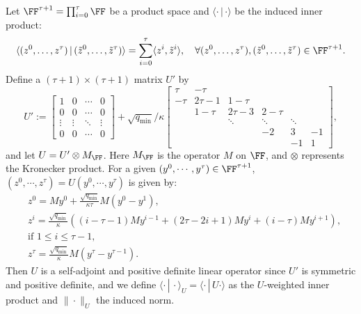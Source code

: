 {Let $\FF^{\tau+1}=\prod_{i=0}^{\tau}\FF$ be a product space and $\langle\cdot\, |\,\cdot \rangle$ be the induced  inner product:
$$\langle (z^0,\ldots,z^{\tau})\,|\,(\tilde{z}^0,\ldots,\tilde{z}^{\tau})\rangle=\sum_{i=0}^{\tau}\langle z^i,\tilde{z}^i\rangle,\quad\forall (z^0,\ldots,z^{\tau}), (\tilde{z}^0,\ldots,\tilde{z}^{\tau})\in\FF^{\tau+1}.$$ 
Define a $(\tau+1)\times(\tau+1)$ matrix $U'$ by 
\begin{equation*}%
U':=\begin{bmatrix}1 & 0 & \cdots &0\\
0 & 0 &\cdots & 0\\ \vdots &\vdots & \ddots & \vdots\\
0 & 0 &\cdots & 0 \end{bmatrix}
+\sqrt{q_{\min}}/\kappa\begin{bmatrix} \tau & -\tau &  & \\
-\tau & 2\tau-1 & 1-\tau & \\
 & 1-\tau & 2\tau-3 & 2-\tau  & \\
 & & \ddots & \ddots & \ddots &\\
 & & & -2 & 3  & -1 \\
 & & & &-1 & 1
\end{bmatrix},
\end{equation*}
and let $U=U'\otimes M_\FF$. Here $M_\FF$ is the operator $M$ on $\FF$, and
$\otimes$ represents the Kronecker product. For a given $(y^0,\cdots,y^\tau)\in\FF^{\tau+1}$, $(z^0,\cdots,z^\tau)=U(y^0,\cdots,y^\tau)$ is given by:
\begin{align*}
&z^0=\textstyle
My^0+\frac{\sqrt{q_{\min}}}{\kappa\tau} M(y^0-y^1),\\
&z^i =
\textstyle\frac{\sqrt{q_{\min}}}{\kappa}((i-\tau-1)My^{i-1}+(2\tau-2i+1)My^i+(i-\tau)My^{i+1}),\\
&\text{
if } 1\le i\le \tau-1,\\
&z^{\tau}=\textstyle\frac{\sqrt{q_{\min}}}{\kappa} M(y^{\tau}-y^{\tau-1}).
\end{align*} 
Then $U$ is a self-adjoint and positive definite linear operator since $U'$ is
symmetric and positive definite, and we define $\langle\cdot\, |\,
\cdot\rangle_U=\langle\cdot\, |\, U\cdot\rangle$ as the $U$-weighted inner
product and $\|\cdot\|_U$ the induced norm.
 
}
